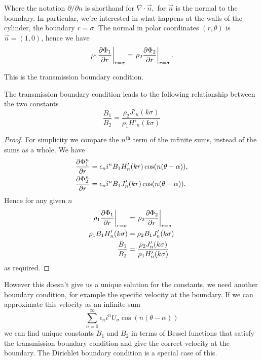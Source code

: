 Where the notation $\partial / \partial n $ is shorthand for $ \nabla \cdot \vec{n},$ for $\vec{n}$ is the normal to the boundary. In particular, we're interested in what happens at the walls of the cylinder, the boundary $r=\sigma$. The normal in polar coordinates $(r, \theta)$ is $\vec{n} = (1, 0)$, hence we have
\begin{equation}
  \left.\rho_1 \frac{\partial \Phi_1}{\partial r} \right| _{r=\sigma} = \left.\rho_2 \frac{\partial \Phi_2}{\partial r} \right| _{r=\sigma}.
\end{equation}

This is the transmission boundary condition.

\begin{propn}
  The transmission boundary condition leads to the following relationship between the two constants
  \[ \frac{B_1}{B_2} = \frac{\rho_2 J'_n(k\sigma)}{\rho_1 H'_n(k\sigma)} \]
\end{propn}
\begin{proof}
  For simplicity we compare the $n^{\text{th}}$ term of the infinite sums, instead of the sums as a whole. We have
  \begin{align*}
    \frac{\partial \Phi^n_1}{\partial r}
    &= \epsilon_n i^n B_1 H'_n(kr) \cos(n(\theta-\alpha)), \\
    \frac{\partial \Phi^n_2}{\partial r}
    &= \epsilon_n i^n B_1 J'_n(kr) \cos(n(\theta-\alpha)). \\
  \end{align*}
  Hence for any given $n$
  \begin{align*}
    \left.\rho_1 \frac{\partial \Phi_1}{\partial r} \right| _{r=\sigma} &= \left.\rho_2 \frac{\partial \Phi_2}{\partial r} \right| _{r=\sigma} \\
    \rho_1 B_1 H'_n(k\sigma) &= \rho_2 B_1 J'_n(k\sigma)\\
    \frac{B_1}{B_2} &= \frac{\rho_2 J'_n(k\sigma)}{\rho_1 H'_n(k\sigma)}
  \end{align*}
  as required.
\end{proof}

However this doesn't give us a unique solution for the constants, we need another boundary condition, for example the specific velocity at the boundary. If we can approximate this velocity as an infinite sum
\begin{equation}
  \sum^{\infty}_{n=0} \epsilon_n i^n U_{\sigma} \cos(n(\theta-\alpha))
\end{equation}
we can find unique constants $B_1$ and $B_2$ in terms of Bessel functions that satisfy the transmission boundary condition and give the correct velocity at the boundary. The Dirichlet boundary condition is a special case of this.
